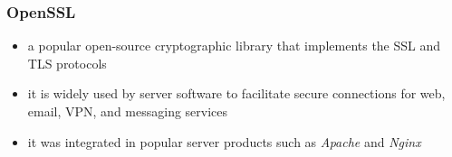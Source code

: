 \documentclass[
    11pt, %
    aspectratio=169, %
]{beamer}
\begin{document}
\begin{frame}
	\frametitle{OpenSSL}
            \begin{itemize}
                \item a popular open-source cryptographic library that implements the SSL and TLS protocols
                \newline
                \item it is widely used by server software to facilitate secure \newline connections for web, email, VPN, and messaging services
                \newline
                \item it was integrated in popular server products such as \emph{Apache} \newline and \emph{Nginx}
            \end{itemize}
\end{frame}
\end{document}
